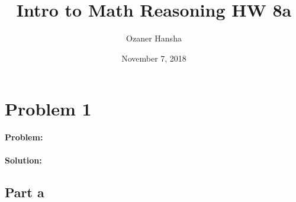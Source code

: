 \documentclass{article}
\begin{document}
\title{Intro to Math Reasoning HW 8a}
\author{Ozaner Hansha}
\date{November 7, 2018}
\maketitle

\section*{Problem 1}
\textbf{Problem:}
\\\\
\textbf{Solution:}

\subsection*{Part a}
\end{document}
